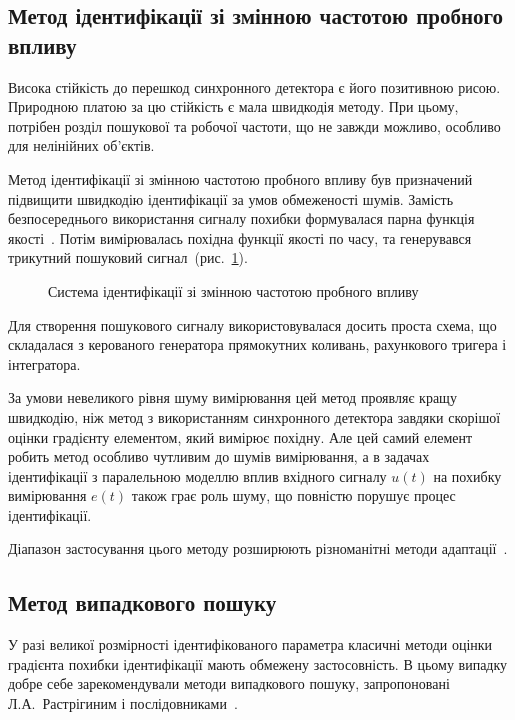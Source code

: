 
\subsection{Метод ідентифікації зі змінною частотою пробного впливу} %

Висока стійкість до перешкод синхронного детектора є його
позитивною рисою. Природною платою за цю стійкість є мала
швидкодія методу.
При цьому, потрібен розділ пошукової та робочої частоти, що не
завжди можливо, особливо для нелінійних об'єктів.


Метод ідентифікації зі змінною частотою пробного впливу
був призначений підвищити швидкодію ідентифікації
за умов обмеженості шумів.
Замість безпосереднього використання сигналу похибки формувалася
парна функція якості~\cite{adopt_cont_sys,rastr_adop_complex_sys}.
Потім вимірювалась похідна функції якості по часу,
та генерувався трикутний пошуковий сигнал~(рис.~\ref{atu:f:varfreq}).


\begin{figure}[htb!]
\begin{center}

\end{center}
\caption{Система ідентифікації зі змінною частотою пробного впливу}
\label{atu:f:varfreq}
\end{figure}

Для створення пошукового сигналу використовувалася досить
проста схема,
що складалася з керованого генератора прямокутних коливань,
рахункового тригера і інтегратора.

За умови невеликого рівня шуму вимірювання
цей метод проявляє кращу швидкодію,
ніж метод з використанням синхронного детектора
завдяки скорішої оцінки градієнту елементом,
який вимірює похідну.
Але цей самий елемент
робить метод особливо чутливим до шумів вимірювання, а в
задачах ідентифікації з паралельною моделлю вплив вхідного
сигналу \(u(t)\) на похибку вимірювання \(e (t) \) також
грає роль шуму, що повністю порушує процес ідентифікації.

Діапазон застосування цього методу розширюють різноманітні
методи адаптації~\cite{auto_optim_intask}.


\subsection{Метод випадкового пошуку}%

У разі великої розмірності ідентифікованого параметра класичні
методи оцінки градієнта похибки ідентифікації мають обмежену
застосовність.
В цьому випадку добре себе зарекомендували методи випадкового
пошуку, запропоновані Л.А.~Растрігиним і послідовниками~\cite{rastr_rand_search,rastr_rand_search_adopt,ivanov_stoh_alg_int,gladkov_optim_nongrad}.

